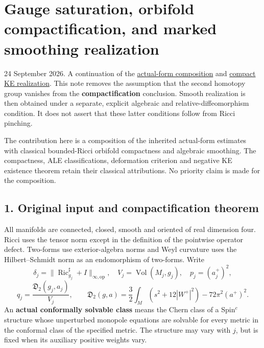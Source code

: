\documentclass[
  11pt,
]{article}
\author{}
\date{}
\begin{document}
\hypertarget{gauge-saturation-orbifold-compactification-and-marked-smoothing-realization}{%
\section{Gauge saturation, orbifold compactification, and marked
smoothing
realization}\label{gauge-saturation-orbifold-compactification-and-marked-smoothing-realization}}

24 September 2026. A continuation of the
\href{../mathematics/current/line1_composed_application.md}{actual-form
composition} and \href{20260923_gauge_saturation_ke.md}{compact KE
realization}. This note removes the assumption that the second homotopy
group vanishes from the \textbf{compactification} conclusion. Smooth
realization is then obtained under a separate, explicit algebraic and
relative-diffeomorphism condition. It does not assert that these latter
conditions follow from Ricci pinching.

The contribution here is a composition of the inherited actual-form
estimates with classical bounded-Ricci orbifold compactness and
algebraic smoothing. The compactness, ALE classifications, deformation
criterion and negative KE existence theorem retain their classical
attributions. No priority claim is made for the composition.

\hypertarget{original-input-and-compactification-theorem}{%
\subsection{1. Original input and compactification
theorem}\label{original-input-and-compactification-theorem}}

All manifolds are connected, closed, smooth and oriented of real
dimension four. Ricci uses the tensor norm except in the definition of
the pointwise operator defect. Two-forms use exterior-algebra norms and
Weyl curvature uses the Hilbert--Schmidt norm as an endomorphism of
two-forms. Write \[
 \delta_j=\|\operatorname{Ric}_{g_j}^{\sharp}+I\|_{\infty,\mathrm{op}},
 \quad V_j=\operatorname{Vol}(M_j,g_j),\quad
 p_j=(a_j^+)^2,
\] \[
 q_j=\frac{\mathfrak D_2(g_j,a_j)}{V_j},\qquad
 \mathfrak D_2(g,a)=\frac32\int_M(s^2+12|W^+|^2)-72\pi^2(a^+)^2.
 \tag{1}
\] An \textbf{actual conformally solvable class} means the Chern class
of a Spin\(^c\) structure whose unperturbed monopole equations are
solvable for every metric in the conformal class of the specified
metric. The structure may vary with \(j\), but is fixed when its
auxiliary positive weights vary.
\end{document}
